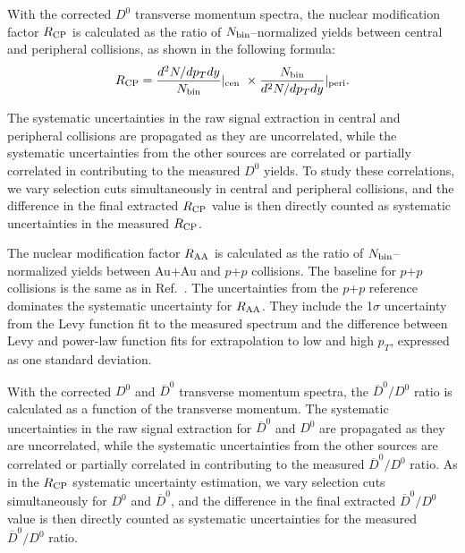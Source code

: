 \documentclass[%
 reprint,	
showpacs,
 amsmath,amssymb,
 aps,
 prc,
]{revtex4-1}
\begin{document}
With the corrected $D^0$ transverse momentum spectra, the nuclear modification factor $R_{\rm CP}$ is calculated as the ratio of $N_{\rm bin}$--normalized yields between central and peripheral collisions, as shown in the following formula:
\begin{equation}
  R_{\rm CP} = \frac{d^2N/dp_{T}dy}{N_{\rm bin}} |_{\rm cen\ } \times \frac{N_{\rm bin}} {d^2N/dp_{T}dy} |_{\rm peri }.
\label{equ:equation3}
\end{equation}

The systematic uncertainties in the raw signal extraction in central and peripheral collisions are propagated as they are uncorrelated, while the systematic uncertainties from the other sources are correlated or partially correlated in contributing to the measured $D^0$ yields. To study these correlations, we vary selection cuts simultaneously in central and peripheral collisions, and the difference in the final extracted $R_{\rm CP}$ value is then directly counted as systematic uncertainties in the measured $R_{\rm CP}$.

The nuclear modification factor $R_{\rm AA}$ is calculated as the ratio of $N_{\rm bin}$--normalized yields between Au+Au and $p$+$p$ collisions. The baseline for $p$+$p$ collisions is the same as in Ref.~\cite{Star_D_RAA}. The uncertainties from the $p$+$p$ reference dominates the systematic uncertainty for $R_{\rm AA}$. They include the 1$\sigma$ uncertainty from the Levy function fit to the measured spectrum and the difference between Levy and power-law function fits for extrapolation to low and high $p_T$, expressed as one standard deviation.

With the corrected $D^0$ and $\overline{D}^{0}$ transverse momentum spectra, the $\overline{D}^{0}/D^0$ ratio is calculated as a function of the transverse momentum. The systematic uncertainties in the raw signal extraction for $\overline{D}^{0}$ and $D^0$ are propagated as they are uncorrelated, while the systematic uncertainties from the other sources are correlated or partially correlated in contributing to the measured $\overline{D}^{0}/D^0$ ratio. As in the $R_{\rm CP}$ systematic uncertainty estimation, we vary selection cuts simultaneously for $D^0$ and $\overline{D}^{0}$, and the difference in the final extracted $\overline{D}^{0}/D^0$ value is then directly counted as systematic uncertainties for the measured $\overline{D}^{0}/D^0$ ratio.
\end{document}
